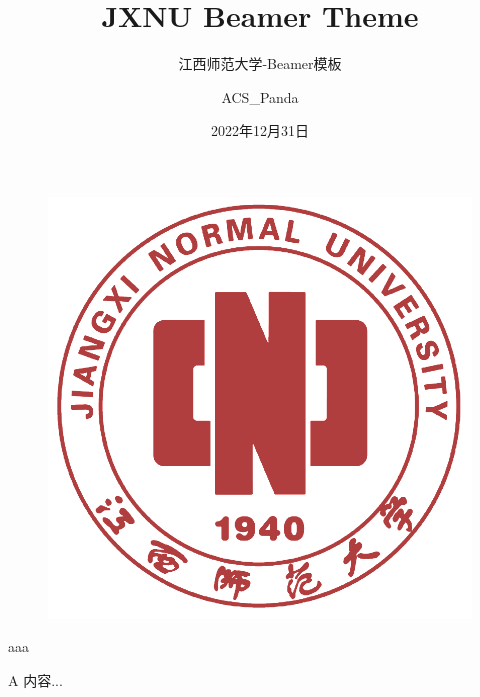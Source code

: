 \documentclass{beamer}
\author{ACS\_Panda}
\title{JXNU Beamer Theme}
\subtitle{江西师范大学-Beamer模板}
\institute{江西师范大学-计算机科学协会}
\date{2022年12月31日}
\begin{document}
\kaishu
\begin{frame}
    \titlepage
    \begin{figure}[htpb]
        \begin{center}
            \includegraphics[width=0.2\linewidth]{pic/JXNU_logo.png}
        \end{center}
    \end{figure}
\end{frame}


\begin{frame}
    \tableofcontents[sectionstyle=show,subsectionstyle=show/shaded/hide,subsubsectionstyle=show/shaded/hide]
\end{frame}


\begin{section}{aaa}
\begin{frame}{A}
    内容...
\end{frame}

\end{section}
\end{document}
